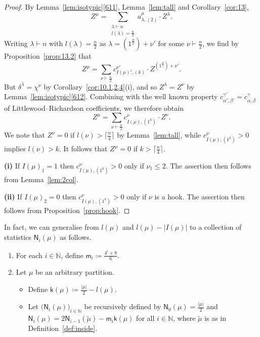 \documentclass[ALCO, Unicode]{cedram}
\newcommand{\sk}{\mathsf{k}}
\newcommand{\sm}{\mathsf{m}}
\newcommand{\sn}{\mathsf{N}}
\newcommand{\N}{\mathbb{N}}
\begin{document}
\begin{proof}
	By Lemma~\ref{lem:isotypic}\ref{611},	Lemma~\ref{lem:tall} and Corollary~\ref{cor:13}, 
	\[ Z^\mu = \sum_{\substack{\lambda\vdash n\\l(\lambda)=\frac{n}{2}}} a^\mu_{\lambda,(2)}\cdot Z^\lambda. \]
	Writing $\lambda\vdash n$ with $l(\lambda)=\tfrac{n}{2}$ as $\lambda=(1^{\tfrac{n}{2}})+\nu'$ for some $\nu\vdash\tfrac{n}{2}$, we find by Proposition~\ref{prop:13.2} that 
	\[ Z^\mu = \sum_{\nu\vdash\tfrac{n}{2}} c^{\nu'}_{I(\mu)',(k)}\cdot Z^{(1^{\frac{n}{2}})+\nu'}. \]
	But $\delta^\lambda=\chi^\nu$ by Corollary~\ref{cor:10.1,2,4}(i), and so $Z^\lambda=Z^\nu$ by Lemma~\ref{lem:isotypic}\ref{612}. Combining with the well known property $c^{\gamma'}_{\alpha',\beta'} = c^\gamma_{\alpha,\beta}$ of Littlewood--Richardson coefficients, we therefore obtain
	\[ Z^\mu = \sum_{\nu\vdash\tfrac{n}{2}} c^{\nu}_{I(\mu),(1^k)}\cdot Z^{\nu}. \]
	We note that $Z^\nu=0$ if $l(\nu)>\lceil\frac{n}{4}\rceil$ by Lemma~\ref{lem:tall}, while $c^\nu_{I(\mu),(1^k)}>0$ implies $l(\nu)>k$. It follows that $Z^\mu=0$ if $k>\lceil\frac{n}{4}\rceil$.
	
	\noindent\textbf{(i)} If $I(\mu)_1=1$ then $c^\nu_{I(\mu),(1^k)}>0$ only if $\nu_1\le 2$. The assertion then follows from Lemma~\ref{lem:2col}.
	
	\noindent\textbf{(ii)} If $I(\mu)_2=0$ then $c^\nu_{I(\mu),(1^k)}>0$ only if $\nu$ is a hook. The assertion then follows from Proposition~\ref{prop:hook}.
\end{proof}

In fact, we can generalise from $l(\mu)$ and $l(\mu)-|I(\mu)|$ to a collection of statistics $\sn_i(\mu)$ as follows.

\begin{definition}\label{def:stats}
	\begin{enumerate}[label=\textup{(\roman*)}]
		\item For each $i\in\N$, define $\mathsf{m}_i\coloneqq \frac{4^i+8}{6}$.
		
		\item Let $\mu$ be an arbitrary partition. 
		\begin{itemize}
			\item[$\circ$] Define $\sk(\mu)\coloneqq \frac{|\mu|}{2}-l(\mu)$.
			\item[$\circ$] Let $\big(\sn_i(\mu)\big)_{i\in\N}$ be recursively defined by $\sn_0(\mu)=\frac{|\mu|}{2}$ and $\sn_i(\mu)=2\sn_{i-1}(\tilde{\mu}) - \sm_i\sk(\mu)$ for all $i\in\N$, where $\tilde{\mu}$ is as in Definition~\ref{def:inside}.
		\end{itemize}
	\end{enumerate}
\end{definition}
\end{document}
